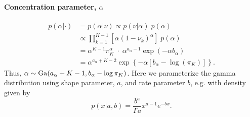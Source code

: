 \paragraph{Concentration parameter, $\alpha$}
\begin{align*}
p(\alpha|\cdot) & = p(\alpha|\nu) \propto p(\nu|\alpha)\;p(\alpha)\\
& \propto \prod_{k=1}^{K-1} \left[\alpha (1-\nu_k)^\alpha \right]\;p(\alpha)\\
& = \alpha^{K-1} \pi_K^\alpha\; \cdot \; \alpha^{a_\alpha - 1} \exp(-\alpha b_\alpha)\\
& = \alpha^{a_\alpha + K - 2} \exp\left\{-\alpha \left[ b_\alpha - \log(\pi_K)\right]\right\}. 
\end{align*}
Thus, $\alpha \sim \operatorname{Ga}(a_\alpha + K - 1, b_\alpha - \log \pi_K)$. Here we parameterize the gamma distribution using shape parameter, $a$, and rate parameter $b$, e.g. with density given by
\begin{equation*}
p(x|a,b) = \frac{b^a}{\Gamma a}x^{a-1} e^{-bx}.
\end{equation*}